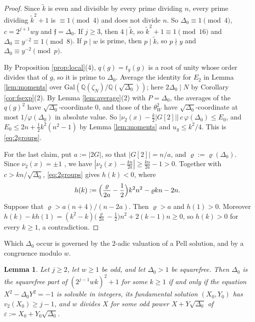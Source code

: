 \documentclass[10pt]{article}
\theoremstyle{plain}
\newtheorem{lemma}[theorem]{Lemma}
\theoremstyle{definition}
\theoremstyle{plain}
\begin{document}
\begin{proof}
Since $\tilde k$ is even and divisible by every prime dividing $n$, every prime dividing $\tilde k^2+1$ is $\equiv1\pmod4$ and does not divide $n$. So $\Delta_0\equiv1\pmod 4$, $c=2^{j+1}wy$ and $\mathfrak{f}=\Delta_0$. If $j\geq3$, then $4\mid \tilde k$, so $\tilde k^2+1\equiv1\pmod{16}$ and $\Delta_0\equiv y^{-2}\equiv1\pmod8$. If $p\mid w$ is prime, then $p\mid \tilde k$, so $p\nmid y$ and $\Delta_0\equiv y^{-2}\pmod p$.

By Proposition \ref{prop:local}(4), $q(g)=t_g(g)$ is a root of unity whose order divides that of $g$, so it is prime to $\Delta_0$. Average the identity for $E_2$ in Lemma \ref{lem:moments} over $\mathrm{Gal}(\mathbb{Q}(\zeta_N)/\mathbb{Q}(\sqrt{\Delta_0}))$; here $2\Delta_0\mid N$ by Corollary \ref{cor:fsexp}(2). By Lemma \ref{lem:average}(2) with $P=\Delta_0$, the averages of the $q(g)^2$ have $\sqrt{\Delta_0}$-coordinate $0$, and those of the $\theta_W^2$ have $\sqrt{\Delta_0}$-coordinate at most $1/\varphi(\Delta_0)$ in absolute value. So $\bigl|\nu_2(x)-\frac k2|G[2]|\bigr|\,c\,\varphi(\Delta_0)\leq E_0$, and $E_0\leq2n+\frac12k^2(n^2-1)$ by Lemma \ref{lem:moments} and $u_g\leq k^2/4$. This is \eqref{eq:2groups}.

For the last claim, put $a:=|2G|$, so that $|G[2]|=n/a$, and $\varrho:=\varrho(\Delta_0)$. Since $\nu_2(x)=\pm1$ \cite[Theorem 2.7]{MR3427429}, we have $|\nu_2(x)-\frac{kn}{2a}|\geq\frac{kn}{2a}-1>0$. Together with $c>kn/\sqrt{\Delta_0}$, \eqref{eq:2groups} gives $h(k)<0$, where
\[
h(k):=\Bigl(\frac{\varrho}{2a}-\frac12\Bigr)k^2n^2-\varrho kn-2n .
\]
Suppose that $\varrho>a(n+4)/(n-2a)$. Then $\varrho>a$ and $h(1)>0$. Moreover $h(k)-kh(1)=(k^2-k)\bigl(\frac\varrho{2a}-\frac12\bigr)n^2+2(k-1)n\geq0$, so $h(k)>0$ for every $k\geq1$, a contradiction.
\end{proof}

Which $\Delta_0$ occur is governed by the $2$-adic valuation of a Pell solution, and by a congruence modulo $w$.

\begin{lemma}\label{lem:2adic}
Let $j\geq2$, let $w\geq1$ be odd, and let $\Delta_0>1$ be squarefree. Then $\Delta_0$ is the squarefree part of $(2^{j-1}wk)^2+1$ for some $k\geq1$ if and only if the equation $X^2-\Delta_0Y^2=-1$ is solvable in integers, its fundamental solution $(X_0,Y_0)$ has $v_2(X_0)\geq j-1$, and $w$ divides $X$ for some odd power $X+Y\sqrt{\Delta_0}$ of $\varepsilon:=X_0+Y_0\sqrt{\Delta_0}$.
\end{lemma}
\end{document}
